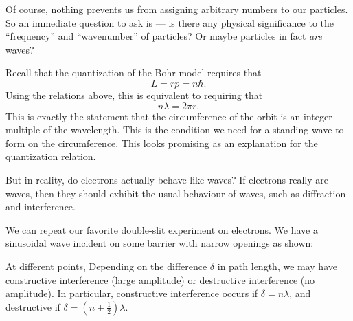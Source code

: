 \documentclass[a4paper]{article}
\begin{document}
Of course, nothing prevents us from assigning arbitrary numbers to our particles. So an immediate question to ask is --- is there any physical significance to the ``frequency'' and ``wavenumber'' of particles? Or maybe particles in fact \emph{are} waves?

Recall that the quantization of the Bohr model requires that
\[
  L = rp = n\hbar.
\]
Using the relations above, this is equivalent to requiring that
\[
  n\lambda = 2\pi r.
\]
This is exactly the statement that the circumference of the orbit is an integer multiple of the wavelength. This is the condition we need for a standing wave to form on the circumference. This looks promising as an explanation for the quantization relation.

But in reality, do electrons actually behave like waves? If electrons really are waves, then they should exhibit the usual behaviour of waves, such as diffraction and interference.

We can repeat our favorite double-slit experiment on electrons. We have a sinusoidal wave incident on some barrier with narrow openings as shown:
\begin{center}
\end{center}
At different points, Depending on the difference $\delta$ in path length, we may have constructive interference (large amplitude) or destructive interference (no amplitude). In particular, constructive interference occurs if $\delta = n\lambda$, and destructive if $\delta = (n + \frac{1}{2})\lambda$.
\end{document}
